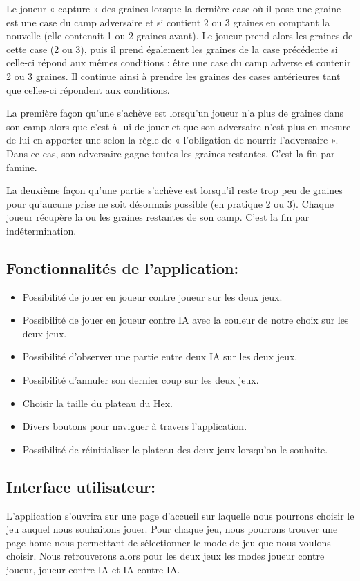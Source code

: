 \begin{itemize}
    Le joueur « capture » des graines lorsque la dernière case où il pose une graine est une case du camp adversaire et si contient 2 ou 3 
    graines en comptant la nouvelle (elle contenait 1 ou 2 graines avant). Le joueur prend alors les graines de cette case (2 ou 3), puis il 
    prend également les graines de la case précédente si celle-ci répond aux mêmes conditions : être une case du camp adverse et contenir 2 ou 3 graines. 
    Il continue ainsi à prendre les graines des cases antérieures tant que celles-ci répondent aux conditions.

    La première façon qu'une s'achève est lorsqu’un joueur n’a plus de graines dans son camp alors que c’est à lui de jouer et que son adversaire n’est plus en mesure 
    de lui en apporter une selon la règle de « l’obligation de nourrir l’adversaire ». Dans ce cas, son adversaire gagne toutes les graines restantes. C’est 
    la fin par famine.

    La deuxième façon qu'une partie s'achève est lorsqu’il reste trop peu de graines pour qu’aucune prise ne soit désormais possible (en pratique 2 ou 3). 
    Chaque joueur récupère la ou les graines restantes de son camp. C’est la fin par indétermination.
    

\end{itemize}

\subsection*{Fonctionnalités de l'application:}
\begin{itemize}
    \item Possibilité de jouer en joueur contre joueur sur les deux jeux.
    \item Possibilité de jouer en joueur contre IA avec la couleur de notre choix sur  les deux jeux.
    \item Possibilité d'observer une partie entre deux IA sur les deux jeux.
    \item Possibilité d'annuler son dernier coup sur les deux jeux.
    \item Choisir la taille du plateau du Hex. 
    \item Divers boutons pour naviguer à travers l'application.
    \item Possibilité de réinitialiser le plateau des deux jeux lorsqu'on le souhaite.
\end{itemize}

\subsection*{Interface utilisateur:}
L'application s'ouvrira sur une page d'accueil sur laquelle nous pourrons choisir le jeu auquel nous souhaitons jouer.
Pour chaque jeu, nous pourrons trouver une page home nous permettant de sélectionner le mode de jeu que nous voulons
choisir. Nous retrouverons alors pour les deux jeux les modes joueur contre joueur, joueur contre IA et IA contre IA.

